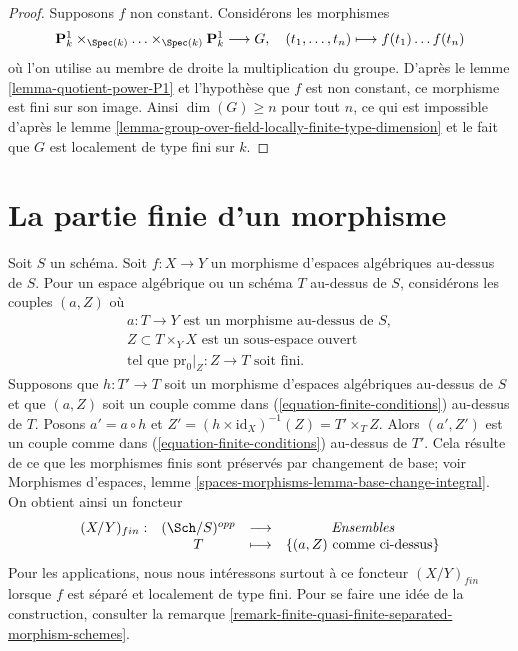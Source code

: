 \begin{proof}
Supposons $f$ non constant. Considérons les morphismes
$$
\mathbf{P}^1_k \times_{\Spec(k)} \ldots \times_{\Spec(k)} \mathbf{P}^1_k
\longrightarrow G,
\quad (t_1, \ldots, t_n) \longmapsto f(t_1) \ldots f(t_n)
$$
où l'on utilise au membre de droite la multiplication du groupe.
D'après le lemme \ref{lemma-quotient-power-P1} et l'hypothèse que $f$
est non constant, ce morphisme est fini sur son image.
Ainsi $\dim(G) \geq n$ pour tout $n$, ce qui est impossible d'après le
lemme \ref{lemma-group-over-field-locally-finite-type-dimension}
et le fait que $G$ est localement de type fini sur $k$.
\end{proof}




\section{La partie finie d'un morphisme}
\label{section-finite}

\noindent
Soit $S$ un schéma.
Soit $f : X \to Y$ un morphisme d'espaces algébriques au-dessus de $S$.
Pour un espace algébrique ou un schéma $T$ au-dessus de $S$, considérons les couples
$(a, Z)$ où
\begin{equation}
\label{equation-finite-conditions}
\begin{matrix}
a : T \to Y\text{ est un morphisme au-dessus de }S, \\
Z \subset T \times_Y X\text{ est un sous-espace ouvert} \\
\text{tel que }\text{pr}_0|_Z : Z \to T\text{ soit fini.}
\end{matrix}
\end{equation}
Supposons que $h : T' \to T$ soit un morphisme d'espaces algébriques au-dessus de $S$
et que $(a, Z)$ soit un couple comme dans (\ref{equation-finite-conditions}) au-dessus de $T$. Posons
$a' = a \circ h$ et $Z' = (h \times \text{id}_X)^{-1}(Z) = T' \times_T Z$.
Alors $(a', Z')$ est un couple comme dans (\ref{equation-finite-conditions}) au-dessus de $T'$.
Cela résulte de ce que les morphismes finis sont préservés par changement de base; voir
Morphismes d'espaces, lemme \ref{spaces-morphisms-lemma-base-change-integral}.
On obtient ainsi un foncteur
\begin{equation}
\label{equation-finite}
\begin{matrix}
(X/Y)_{fin} : &
(\Sch/S)^{opp} &
\longrightarrow &
\textit{Ensembles} \\
& T & \longmapsto &
\{(a, Z)\text{ comme ci-dessus}\}
\end{matrix}
\end{equation}
Pour les applications, nous nous intéressons surtout à ce foncteur $(X/Y)_{fin}$
lorsque $f$ est séparé et localement de type fini. Pour se faire une idée
de la construction, consulter la
remarque \ref{remark-finite-quasi-finite-separated-morphism-schemes}.


